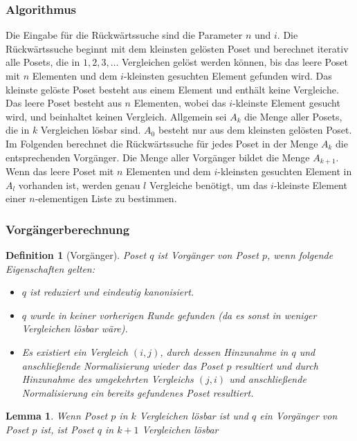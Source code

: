 \documentclass[10pt,journal,compsoc]{IEEEtran}
\newtheorem{lemma}{Lemma}
\newtheorem{definition}{Definition}
\begin{document}
\subsubsection{Algorithmus} \label{sec:backward:algorithm}

Die Eingabe für die Rückwärtssuche sind die Parameter $n$ und $i$.
Die Rückwärtssuche beginnt mit dem kleinsten gelösten Poset und berechnet iterativ alle Posets, die in $1, 2, 3, \dots$ Vergleichen gelöst werden können, bis das leere Poset mit $n$ Elementen und dem $i$-kleinsten gesuchten Element gefunden wird.
Das kleinste gelöste Poset besteht aus einem Element und enthält keine Vergleiche.
Das leere Poset besteht aus $n$ Elementen, wobei das $i$-kleinste Element gesucht wird, und beinhaltet keinen Vergleich.
Allgemein sei $A_k$ die Menge aller Posets, die in $k$ Vergleichen lösbar sind.
$A_0$ besteht nur aus dem kleinsten gelösten Poset.
Im Folgenden berechnet die Rückwärtssuche für jedes Poset in der Menge $A_k$ die entsprechenden Vorgänger.
Die Menge aller Vorgänger bildet die Menge $A_{k + 1}$.
Wenn das leere Poset mit $n$ Elementen und dem $i$-kleinsten gesuchten Element in $A_l$ vorhanden ist, werden genau $l$ Vergleiche benötigt, um das $i$-kleinste Element einer $n$-elementigen Liste zu bestimmen.

\subsubsection{Vorgängerberechnung} \label{sec:backward:predecessor_calculation}

\begin{definition}[Vorgänger] \label{definition:predecessor_calculation}
  Poset $q$ ist Vorgänger von Poset $p$, wenn folgende Eigenschaften gelten:
  \begin{itemize}
    \item $q$ ist reduziert und eindeutig kanonisiert.
    \item $q$ wurde in keiner vorherigen Runde gefunden (da es sonst in weniger Vergleichen lösbar wäre).
    \item Es existiert ein Vergleich $(i, j)$, durch dessen Hinzunahme in $q$ und anschließende Normalisierung wieder das Poset $p$ resultiert und durch Hinzunahme des umgekehrten Vergleichs $(j, i)$ und anschließende Normalisierung ein bereits gefundenes Poset resultiert.
  \end{itemize}
\end{definition}

\begin{lemma} \label{lemma:predecessor_calculation}
  Wenn Poset $p$ in $k$ Vergleichen lösbar ist und $q$ ein Vorgänger von Poset $p$ ist, ist Poset $q$ in $k + 1$ Vergleichen lösbar
\end{lemma}
\end{document}
